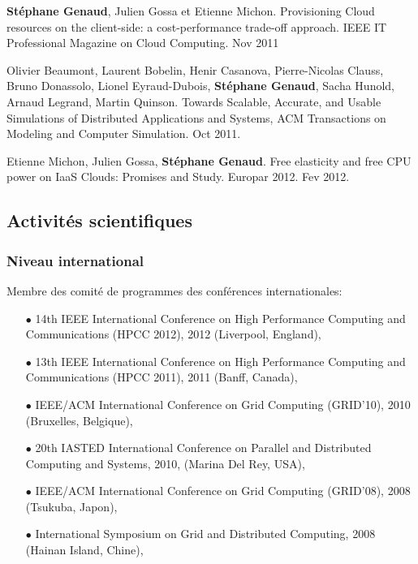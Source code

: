 \documentclass[11pt]{article}
\begin{document}
\begin{thebibliography}{99}
\newblock \textbf{Stéphane Genaud}, Julien Gossa et Etienne Michon.
\newblock Provisioning Cloud resources on the client-side: a cost-performance trade-off approach.
IEEE IT Professional Magazine on Cloud Computing. Nov 2011

Olivier Beaumont, Laurent Bobelin, Henir Casanova, Pierre-Nicolas Clauss, 
Bruno Donassolo, Lionel Eyraud-Dubois, \textbf{Stéphane Genaud}, Sacha Hunold, 
Arnaud Legrand, Martin Quinson.
\newblock
Towards Scalable, Accurate, and Usable Simulations of Distributed Applications and Systems,
ACM Transactions on Modeling and Computer Simulation. Oct 2011.

Etienne Michon, Julien Gossa, \textbf{Stéphane Genaud}.
\newblock Free elasticity and free CPU power on IaaS Clouds: Promises and Study.
Europar 2012. Fev 2012.
\end{thebibliography}


\subsection{Activités scientifiques}

\subsubsection{Niveau international}
Membre des comité de programmes des conférences internationales:\\[-3mm]
\begin{itemize}
\item[$\bullet$] 
14th IEEE International Conference on High Performance Computing and Communications (HPCC 2012), 
2012 (Liverpool, England),
\item[$\bullet$] 
13th IEEE International Conference on High Performance Computing and Communications (HPCC 2011), 
2011 (Banff, Canada),
\item[$\bullet$] 
IEEE/ACM International Conference on Grid Computing (GRID'10), 2010 (Bruxelles, Belgique),
\item[$\bullet$] 
20th IASTED International Conference on Parallel and Distributed Computing and Systems, 2010, (Marina Del Rey, USA),
\item[$\bullet$] 
IEEE/ACM International Conference on Grid Computing (GRID'08), 2008 (Tsukuba, Japon), 
\item [$\bullet$]
International Symposium on Grid and Distributed Computing, 2008 (Hainan Island, Chine),\\
\end{itemize}
\end{document}
